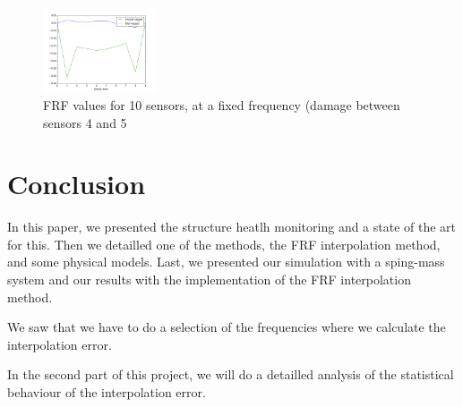 \documentclass[journal]{IEEEtran}
\begin{document}
\begin{figure}[h!]
  \centering
  \includegraphics[width=0.3\textwidth]{images/globalerror.png}
  \caption{FRF values for 10 sensors, at a fixed frequency (damage between sensors 4 and 5}
  \label{globalerror}
\end{figure}


\section{Conclusion}

In this paper, we presented the structure heatlh monitoring and a state of the art for this. Then we detailled one of the methods, the FRF interpolation method, and some physical models. Last, we presented our simulation with a sping-mass system and our results with the implementation of the FRF interpolation method.

We saw that we have to do a selection of the frequencies where we calculate the interpolation error. 

In the second part of this project, we will do a detailled analysis of the statistical behaviour of the interpolation error.





%
%

\nocite{*}
\printbibliography
\end{document}
